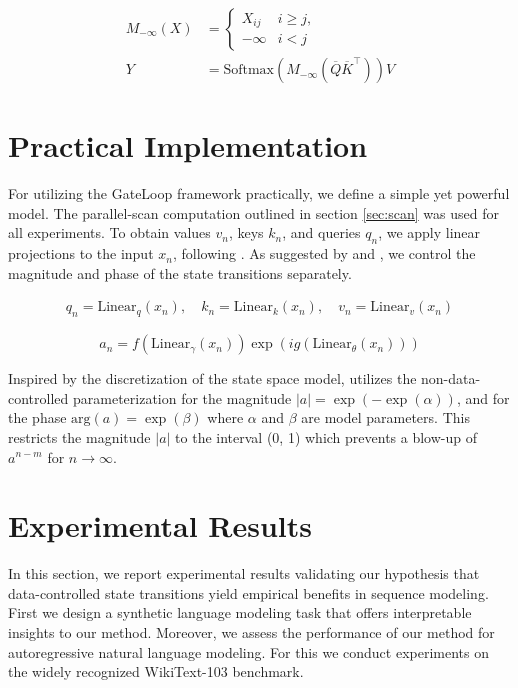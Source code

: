 \begin{align}
M_{-\infty}(X) &= \begin{cases} 
  X_{ij} & i \geq j, \\
  -\infty & i < j 
\end{cases} \\[3pt]
Y &= \text{Softmax}(M_{-\infty}(\overline{Q} \overline{K}^\top))V
\end{align}

\section{Practical Implementation}\label{sec:practical}

For utilizing the GateLoop framework practically, we define a simple yet powerful model. The parallel-scan computation outlined in section \ref{sec:scan} was used for all experiments. To obtain values $v_n$, keys $k_n$, and queries $q_n$, we apply linear projections to the input $x_n$, following \cite{vaswani2023attention}. As suggested by \cite{orvieto2023resurrecting} and \cite{sun2023retentive}, we control the magnitude and phase of the state transitions separately.

\begin{align}
q_n = \text{Linear}_q(x_n), \quad k_n = \text{Linear}_k(x_n), \quad v_n = \text{Linear}_v(x_n)
\end{align}

\begin{equation}
a_n = f(\text{Linear}_\gamma(x_n)) \exp(i g(\text{Linear}_\theta(x_n)))
\end{equation}

Inspired by the discretization of the state space model, \cite{orvieto2023resurrecting} utilizes the non-data-controlled parameterization for the magnitude $|a| = \exp(-\exp(\alpha))$, and for the phase $\text{arg}(a) = \exp(\beta)$ where $\alpha$ and $\beta$ are model parameters. This restricts the magnitude $|a|$ to the interval (0, 1) which prevents a blow-up of $a^{n-m}$ for $n \to \infty$. 

\section{Experimental Results}\label{sec:experiments}
In this section, we report experimental results validating our hypothesis that data-controlled state transitions yield empirical benefits in sequence modeling. First we design a synthetic language modeling task that offers interpretable insights to our method. Moreover, we assess the performance of our method for autoregressive natural language modeling. For this we conduct experiments on the widely recognized WikiText-103 benchmark.

